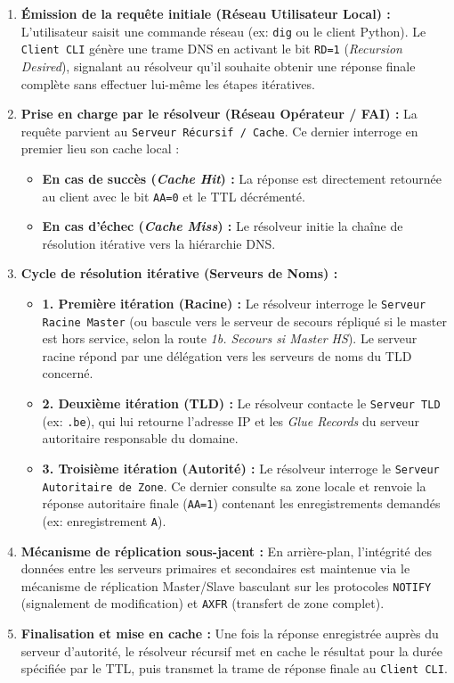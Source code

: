 \begin{enumerate}
    \item \textbf{Émission de la requête initiale (Réseau Utilisateur Local) :}
    L'utilisateur saisit une commande réseau (ex: \texttt{dig} ou le client Python). Le \texttt{Client CLI} génère une trame DNS en activant le bit \texttt{RD=1} (\textit{Recursion Desired}), signalant au résolveur qu'il souhaite obtenir une réponse finale complète sans effectuer lui-même les étapes itératives.

    \item \textbf{Prise en charge par le résolveur (Réseau Opérateur / FAI) :}
    La requête parvient au \texttt{Serveur Récursif / Cache}. Ce dernier interroge en premier lieu son cache local :
    \begin{itemize}
        \item \textbf{En cas de succès (\textit{Cache Hit}) :} La réponse est directement retournée au client avec le bit \texttt{AA=0} et le TTL décrémenté.
        \item \textbf{En cas d'échec (\textit{Cache Miss}) :} Le résolveur initie la chaîne de résolution itérative vers la hiérarchie DNS.
    \end{itemize}

    \item \textbf{Cycle de résolution itérative (Serveurs de Noms) :}
    \begin{itemize}
        \item \textbf{1. Première itération (Racine) :} Le résolveur interroge le \texttt{Serveur Racine Master} (ou bascule vers le serveur de secours répliqué si le master est hors service, selon la route \textit{1b. Secours si Master HS}). Le serveur racine répond par une délégation vers les serveurs de noms du TLD concerné.
        \item \textbf{2. Deuxième itération (TLD) :} Le résolveur contacte le \texttt{Serveur TLD} (ex: \texttt{.be}), qui lui retourne l'adresse IP et les \textit{Glue Records} du serveur autoritaire responsable du domaine.
        \item \textbf{3. Troisième itération (Autorité) :} Le résolveur interroge le \texttt{Serveur Autoritaire de Zone}. Ce dernier consulte sa zone locale et renvoie la réponse autoritaire finale (\texttt{AA=1}) contenant les enregistrements demandés (ex: enregistrement \texttt{A}).
    \end{itemize}

    \item \textbf{Mécanisme de réplication sous-jacent :}
    En arrière-plan, l'intégrité des données entre les serveurs primaires et secondaires est maintenue via le mécanisme de réplication Master/Slave basculant sur les protocoles \texttt{NOTIFY} (signalement de modification) et \texttt{AXFR} (transfert de zone complet).

    \item \textbf{Finalisation et mise en cache :}
    Une fois la réponse enregistrée auprès du serveur d'autorité, le résolveur récursif met en cache le résultat pour la durée spécifiée par le TTL, puis transmet la trame de réponse finale au \texttt{Client CLI}.
\end{enumerate}

